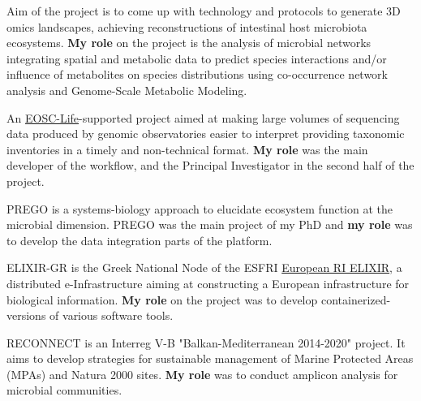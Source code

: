 \documentclass[
    a4paper,
]{../fortysecondscv}
\begin{document}
    \begin{cvtable}[3]

        {
            Aim of the project is to come up with technology and protocols to generate 3D omics landscapes, achieving reconstructions of intestinal host microbiota ecosystems.
            \textbf{My role} on the project is the analysis of microbial networks integrating spatial and metabolic data to predict species interactions and/or influence of metabolites on species distributions using co-occurrence network analysis and Genome-Scale Metabolic Modeling.
        }

            {
                An \href{https://www.eosc-life.eu}{EOSC-Life}-supported project aimed at making large volumes of sequencing data produced by genomic observatories easier to interpret providing taxonomic inventories in a timely and non-technical format. 
                \textbf{My role} was the main developer of the workflow, and the Principal Investigator in the second half of the project.
        }

            {
                PREGO is a systems-biology approach to elucidate ecosystem function at the microbial dimension.
                PREGO was the main project of my PhD and \textbf{my role} was to develop the data integration parts of the platform.
            }
        
            {
                ELIXIR-GR is the Greek National Node of the ESFRI \href{https://elixir-europe.org/}{European RI ELIXIR}, a distributed e-Infrastructure aiming at constructing a European infrastructure for biological information.
                \textbf{My role} on the project was to develop containerized-versions of various software tools.
        }
        
            {RECONNECT is an Interreg V-B "Balkan-Mediterranean 2014-2020" project. 
            It aims to develop strategies for sustainable management of Marine Protected Areas (MPAs) and Natura 2000 sites.
            \textbf{My role} was to conduct amplicon analysis for microbial communities.
        }

    \end{cvtable}
\end{document}
